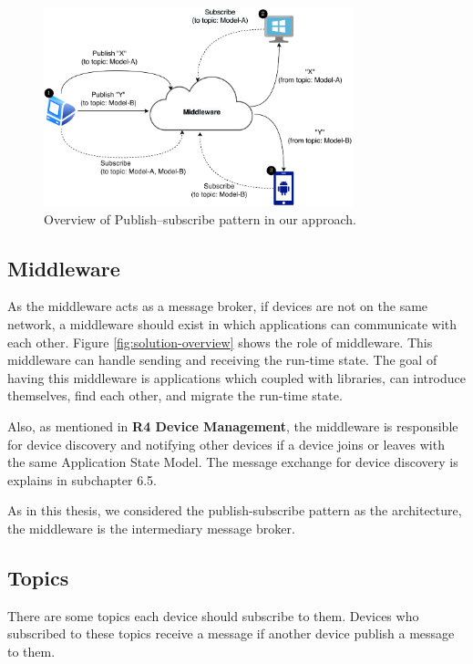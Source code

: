 \vspace{10mm}
\FloatBarrier \begin{figure}[H]
    \includegraphics[width=0.8\textwidth]{../figures/publish-subscribe.pdf}
    \centering
    \caption{Overview of Publish–subscribe pattern in our approach.}
    \label{fig:publish–subscribe}
\end{figure} \FloatBarrier

\subsection{Middleware}
As the middleware acts as a message broker, if devices are not on the same network, a middleware should exist in which applications can communicate with each other. Figure \ref{fig:solution-overview} shows the role of middleware.
This middleware can handle sending and receiving the run-time state.
The goal of having this middleware is applications which coupled with
libraries, can introduce themselves, find each other, and migrate the run-time state.

Also, as mentioned in \textbf{R4 Device Management}, the middleware is responsible for device discovery and notifying other devices if a device joins or leaves with the same Application State Model. The message exchange for device discovery is explains in subchapter 6.5.

As in this thesis, we considered the publish-subscribe pattern as the architecture, the middleware is the intermediary message broker.

\subsection{Topics}
There are some topics each device should subscribe to them. Devices who subscribed to these topics receive a message if another device publish a message to them.

